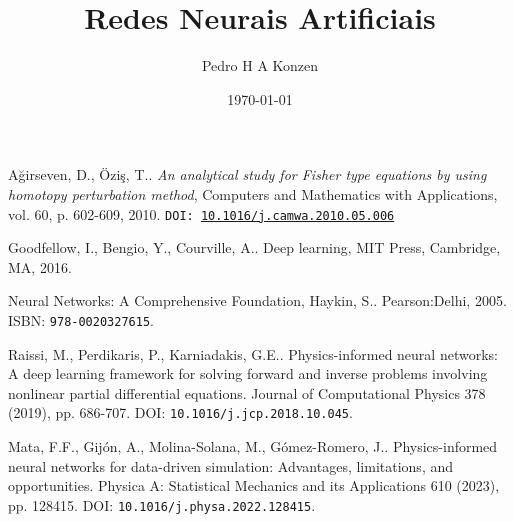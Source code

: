 \documentclass[12pt]{book}
\begin{document}
\frontmatter

\title{Redes Neurais Artificiais}
\author{Pedro H A Konzen}
\date{\today}
\ifishtml
\else
{}
\fi

\maketitle






\tableofcontents
{}

\mainmatter






\ifisbook

\fi

\clearpage
{}
{}
\theendnotes

\ifisbook
\clearpage
{}
\renewcommand\bibname{Referências}
\addcontentsline{toc}{chapter}{\bibname}
\fi

\begin{thebibliography}{99}

    A\u{g}irseven, D., Özi\c{s}, T.. \textit{An analytical study for Fisher type equations by using homotopy   perturbation method}, Computers and Mathematics with Applications, vol. 60, p. 602-609, 2010. \texttt{DOI: \href{http://dx.doi.org/10.1016/j.camwa.2010.05.006}{10.1016/j.camwa.2010.05.006}}

    Goodfellow, I., Bengio, Y., Courville, A.. Deep learning, {MIT} Press, Cambridge, {MA}, 2016.

    Neural Networks: A Comprehensive Foundation, Haykin, S.. Pearson:Delhi, 2005. ISBN: \texttt{978-0020327615}.

    Raissi, M., Perdikaris, P., Karniadakis, G.E.. Physics-informed neural networks: A deep learning framework for solving forward and inverse problems involving nonlinear partial differential equations. Journal of Computational Physics 378 (2019), pp. 686-707. DOI: \texttt{10.1016/j.jcp.2018.10.045}.

    Mata, F.F., Gijón, A., Molina-Solana, M., Gómez-Romero, J.. Physics-informed neural networks for data-driven simulation: Advantages, limitations, and opportunities. Physica A: Statistical Mechanics and its Applications 610 (2023), pp. 128415. DOI: \texttt{10.1016/j.physa.2022.128415}.

\end{thebibliography}
\end{document}
